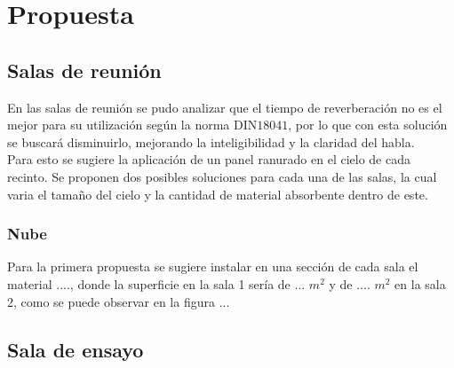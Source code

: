 \section{Propuesta}
\subsection{Salas de reunión}
En las salas de reunión se pudo analizar que el tiempo de reverberación no es el mejor para su utilización según la norma DIN$18041$, por lo que con esta solución se buscará disminuirlo, mejorando la inteligibilidad y la claridad del habla.\\
Para esto se sugiere la aplicación de un panel ranurado en el cielo de cada recinto. Se proponen dos posibles soluciones para cada una de las salas, la cual varia el tamaño del cielo y la cantidad de material absorbente dentro de este.
\subsubsection{Nube}
Para la primera propuesta se sugiere instalar en una sección de cada sala el material ...., donde la superficie en la sala 1 sería de  ... $m^2$ y de .... $m^2$ en la sala 2, como se puede observar en la figura ...

\subsection{Sala de ensayo}